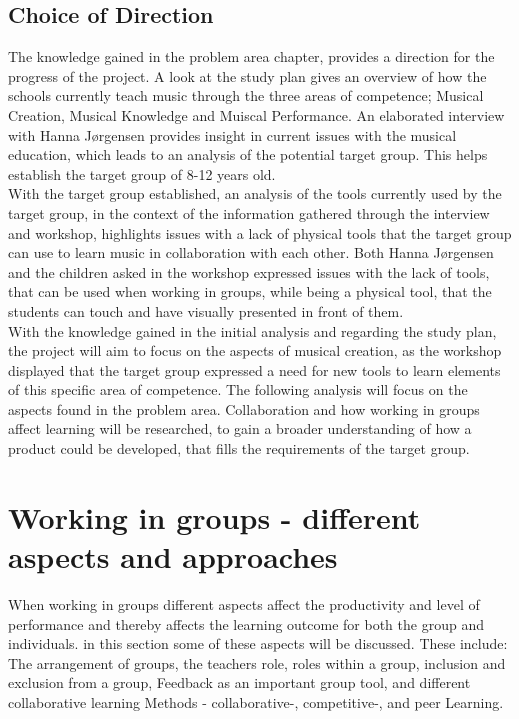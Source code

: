 \subsection{Choice of Direction}
The knowledge gained in the problem area chapter, provides a direction for the progress of the project. A look at the study plan gives an overview of how the schools currently teach music through the three areas of competence; Musical Creation, Musical Knowledge and Muiscal Performance. An elaborated interview with Hanna Jørgensen provides insight in current issues with the musical education, which leads to an analysis of the potential target group. This helps establish the target group of 8-12 years old.\\

With the target group established, an analysis of the tools currently used by the target group, in the context of the information gathered through the interview and workshop, highlights issues with a lack of physical tools that the target group can use to learn music in collaboration with each other. Both Hanna Jørgensen and the children asked in the workshop expressed issues with the lack of tools, that can be used when working in groups, while being a physical tool, that the students can touch and have visually presented in front of them.\\

With the knowledge gained in the initial analysis and regarding the study plan, the project will aim to focus on the aspects of musical creation, as the workshop displayed that the target group expressed a need for new tools to learn elements of this specific area of competence.
The following analysis will focus on the aspects found in the problem area. Collaboration and how working in groups affect learning will be researched, to gain a broader understanding of how a product could be developed, that fills the requirements of the target group.\\





\section{Working in groups - different aspects and approaches} %

When working in groups different aspects affect the productivity and level of performance \cite{GodKlassekultur} and thereby affects the learning outcome for both the group and individuals. in this section some of these aspects will be discussed. These include: The arrangement of groups, the teachers role, roles within a group, inclusion and exclusion from a group, Feedback as an important group tool, and different collaborative learning Methods - collaborative-, competitive-, and peer Learning.

